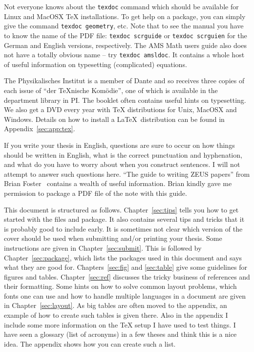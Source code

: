 Not everyone knows about the \texttt{texdoc} command
which should be available for Linux and MacOSX \TeX{} installations. To get help
on a package, you can simply give the command \texttt{texdoc
  geometry}, etc. Note that to see the \KOMAScript{} manual you have
to know the name of the PDF file: \texttt{texdoc scrguide} or
\texttt{texdoc scrguien} for the German and English versions,
respectively. The AMS Math users guide also does not have a totally
obvious name -- try \texttt{texdoc amsldoc}. It
contains a whole host of useful information on typesetting
(complicated) equations.

The Physikalisches Institut is a member of Dante and so receives three
copies of each issue of \foreignquote{ngerman}{der TeXnische Komödie},
one of which is available in the department library in PI.  The
booklet often contains useful hints on typesetting. We also get a DVD
every year with \TeX{}
distributions for Unix, MacOSX and Windows. Details on how to install
a \LaTeX\ distribution can be found in Appendix~\ref{sec:app:tex}.

If you write your thesis in English, questions are sure
to occur on how things should be written in English, what is the
correct punctuation and hyphenation, and what do you have to worry
about when you construct sentences. I will not attempt to answer such
questions here. \enquote{The guide to writing ZEUS
  papers} from Brian Foster~\cite{ZEUSGuide}
contains a wealth of useful information. Brian kindly gave me
permission to package a PDF file of the note with this guide.

This document is structured as follows. Chapter~\ref{sec:tips} tells
you how to get started with the files and package. It also contains
several tips and tricks that it is probably good to include early. It
is sometimes not clear which version of the cover should be used when
submitting and/or printing your thesis. Some instructions are given in
Chapter~\ref{sec:submit}.  This is followed by
Chapter~\ref{sec:package}, which lists the packages used in this
document and says what they are good for. Chapters~\ref{sec:fig} and
\ref{sec:table} give some guidelines for figures and
tables. Chapter~\ref{sec:ref} discusses the tricky business of
references and their formatting. Some hints on how to solve common
layout problems, which fonts one can use and how to handle multiple
languages in a document are given in Chapter~\ref{sec:layout}. As big
tables are often moved to the appendix, an example of how to create
such tables is given there. Also in the appendix I include some more
information on the \TeX{} setup I have used to test things. I have
seen a glossary (list of acronyms) in a few theses and think this is a
nice idea. The appendix shows how you can create such a list.

